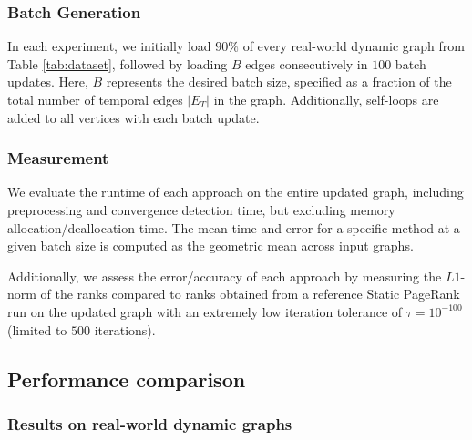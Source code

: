 


\subsubsection{Batch Generation}
\label{sec:batch-generation}

In each experiment, we initially load $90\%$ of every real-world dynamic graph from Table \ref{tab:dataset}, followed by loading $B$ edges consecutively in $100$ batch updates. Here, $B$ represents the desired batch size, specified as a fraction of the total number of temporal edges $|E_T|$ in the graph. Additionally, self-loops are added to all vertices with each batch update.


\subsubsection{Measurement}
\label{sec:measurement}

We evaluate the runtime of each approach on the entire updated graph, including preprocessing and convergence detection time, but excluding memory allocation/deallocation time. The mean time and error for a specific method at a given batch size is computed as the geometric mean across input graphs. Additionally, we assess the error/accuracy of each approach by measuring the $L1$-norm \cite{ohsaka2015efficient} of the ranks compared to ranks obtained from a reference Static PageRank run on the updated graph with an extremely low iteration tolerance of $\tau = 10^{-100}$ (limited to $500$ iterations).




\subsection{Performance comparison}

\subsubsection{Results on real-world dynamic graphs}

